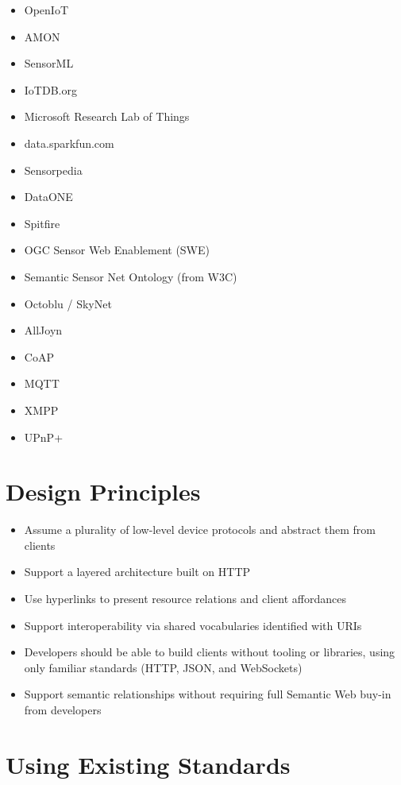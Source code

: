 \documentclass{acm_proc_article-sp}
\begin{document}
\begin{itemize}
    \item OpenIoT
    \item AMON
    \item SensorML
    \item IoTDB.org
    \item Microsoft Research Lab of Things
    \item data.sparkfun.com
    \item Sensorpedia
    \item DataONE
    \item Spitfire
    \item OGC Sensor Web Enablement (SWE)
    \item Semantic Sensor Net Ontology (from W3C)
    \item Octoblu / SkyNet
    \item AllJoyn
    \item CoAP
    \item MQTT
    \item XMPP
    \item UPnP+
\end{itemize}

\section{Design Principles}

\begin{itemize}
    \item Assume a plurality of low-level device protocols and abstract them
        from clients
    \item Support a layered architecture built on HTTP
    \item Use hyperlinks to present resource relations and client affordances
    \item Support interoperability via shared vocabularies identified with URIs
    \item Developers should be able to build clients without tooling or
        libraries, using only familiar standards (HTTP, JSON, and WebSockets)
    \item Support semantic relationships without requiring full Semantic Web
        buy-in from developers
\end{itemize}

\section{Using Existing Standards}
\end{document}
